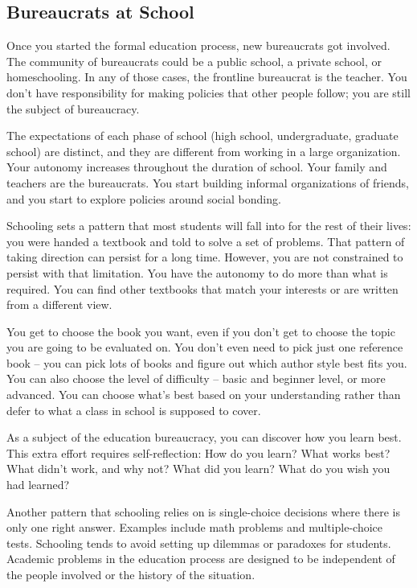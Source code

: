 \subsection*{Bureaucrats at School\label{sec:bureaucracy-of-school}}
Once you started the formal education process, new bureaucrats got involved.  The community of bureaucrats could be a public school, a private school, or homeschooling. In any of those cases, the frontline bureaucrat is the teacher. You don't have responsibility for making policies that other people follow; you are still the subject of bureaucracy.


The expectations of each phase of school (high school, undergraduate, graduate school) are distinct, and they are different from working in a large organization. Your autonomy increases throughout the duration of school. %
Your family and teachers are the bureaucrats. You start building informal organizations of friends, and you start to explore policies around social bonding.

Schooling sets a pattern that most students will fall into for the rest of their lives: you were handed a textbook and told to solve a set of problems. That pattern of taking direction can persist for a long time. However, you are not constrained to persist with that limitation. You have the autonomy to do more than what is required. You can find other textbooks that match your interests or are written from a different view. 

You get to choose the book you want, even if you don't get to choose the topic you are going to be evaluated on. You don't even need to pick just one reference book -- you can pick lots of books and figure out which author style best fits you. You can also choose the level of difficulty -- basic and beginner level, or more advanced. You can choose what's best based on your understanding rather than defer to what a class in school is supposed to cover.

As a subject of the education bureaucracy, you can discover how you learn best. This extra effort requires self-reflection: How do you learn? What works best? What didn't work, and why not? What did you learn? What do you wish you had learned?

Another pattern that schooling relies on is single-choice decisions where there is only one right answer. Examples include math problems and multiple-choice tests. Schooling tends to avoid setting up dilemmas or paradoxes for students. Academic problems in the education process are designed to be independent of the people involved or the history of the situation. 


